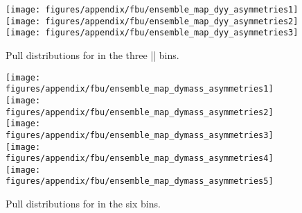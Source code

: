 \begin{figure}
  \begin{center}
  \texttt{[image: figures/appendix/fbu/ensemble\_map\_dyy\_asymmetries1]}
  \texttt{[image: figures/appendix/fbu/ensemble\_map\_dyy\_asymmetries2]}
  \texttt{[image: figures/appendix/fbu/ensemble\_map\_dyy\_asymmetries3]}
  \caption{
    \label{fig:app:pulls_vs_y}
    Pull distributions for \ac{} in the three |\ytt{}| bins.
  }
  \end{center}
\end{figure}

\begin{figure}
  \begin{center}
  \texttt{[image: figures/appendix/fbu/ensemble\_map\_dymass\_asymmetries1]}
  \texttt{[image: figures/appendix/fbu/ensemble\_map\_dymass\_asymmetries2]}
  \texttt{[image: figures/appendix/fbu/ensemble\_map\_dymass\_asymmetries3]}
  \texttt{[image: figures/appendix/fbu/ensemble\_map\_dymass\_asymmetries4]}
  \texttt{[image: figures/appendix/fbu/ensemble\_map\_dymass\_asymmetries5]}
  \caption{
    \label{fig:app:pulls_vs_mass8tev}
    Pull distributions for \ac{} in the six \mtt{} bins.
  }
  \end{center}
\end{figure}


